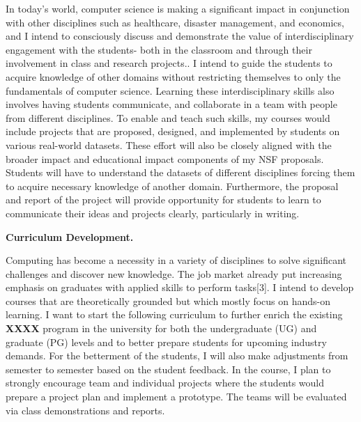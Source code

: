 \documentclass[12pt]{letter} %
\begin{document}
In today's world, computer science is making a significant impact in conjunction with other disciplines such as healthcare, disaster management, and economics, and I intend to consciously discuss and demonstrate the value of interdisciplinary engagement with the students- both in the classroom and through their involvement in class and research projects..
I intend to guide the students  to acquire knowledge of other domains without restricting themselves to only the fundamentals of computer science. Learning these interdisciplinary skills also involves having students communicate, and collaborate in a team with people from different disciplines. To enable and teach such skills, my courses would include projects that are proposed, designed, and implemented by students on various real-world datasets. These effort will also be closely aligned with the broader impact and educational impact components of my NSF proposals.  Students will have to understand the datasets of different disciplines forcing them to acquire necessary knowledge of another domain. Furthermore, the proposal and report of the project will provide opportunity for students to learn to communicate their ideas and projects clearly, particularly in writing.     

\vspace{1.0em} 
\textbf{Curriculum Development.}
\vspace{0.3em}

Computing has become a necessity in a variety of disciplines to solve significant challenges and discover new knowledge. The job market already put  increasing  emphasis on graduates with applied skills to perform tasks[3]. I intend to develop courses that are theoretically grounded but which mostly focus on hands-on learning. I want to start the following curriculum to further enrich the existing \textbf{XXXX} program in the university for both the undergraduate (UG) and graduate (PG) levels and to better prepare students for upcoming industry demands. For the betterment of the students, I will also make adjustments from semester to semester based on the student feedback. In the course, I plan to strongly encourage team and individual projects where the students would prepare a project plan and implement a prototype. The teams will be evaluated via class demonstrations and reports.
\end{document}
